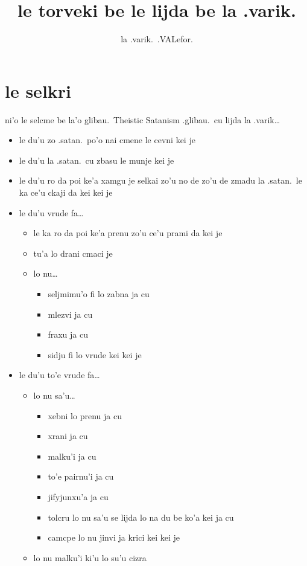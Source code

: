 \documentclass{article}
\title{le torveki be le lijda be la .varik.}
\author{la .varik.\ .VALefor.}
\begin{document}
\maketitle

\section{le selkri}

ni'o le selcme be la'o glibau.\ Theistic Satanism .glibau.\ cu lijda la .varik\ldots

\begin{itemize}
	\item le du'u zo .satan.\ po'o nai cmene le cevni kei je
	\item le du'u la .satan.\ cu zbasu le munje kei je
	\item le du'u ro da poi ke'a xamgu je selkai zo'u no de zo'u de zmadu la .satan.\ le ka ce'u ckaji da kei kei je
	\item le du'u vrude fa\ldots{}
	\begin{itemize}
		\item le ka ro da poi ke'a prenu zo'u ce'u prami da kei je
		\item tu'a lo drani cmaci je
		\item lo nu\ldots{}
		\begin{itemize}
			\item seljmimu'o fi lo zabna ja cu
			\item mlezvi ja cu
			\item fraxu ja cu
			\item sidju fi lo vrude kei kei je
		\end{itemize}
	\end{itemize}
	\item le du'u to'e vrude fa\ldots{}
	\begin{itemize}
		\item lo nu sa'u\ldots{}
		\begin{itemize}
			\item xebni lo prenu ja cu
			\item xrani ja cu
			\item malku'i ja cu
			\item to'e pairnu'i ja cu
			\item jifyjunxu'a ja cu
			\item tolcru lo nu sa'u se lijda lo na du be ko'a kei ja cu
			\item camcpe lo nu jinvi ja krici kei kei je
		\end{itemize}
		\item lo nu malku'i ki'u lo su'u cizra
	\end{itemize}
\end{itemize}
\end{document}
